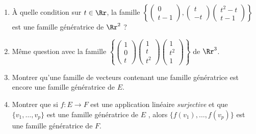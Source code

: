 \documentclass[class=report,crop=false]{standalone}
\begin{document}

\begin{miniexercices}
\sauteligne
\begin{enumerate}
  \item \`A quelle condition sur $t\in\Rr$, la famille
$\left\{
  \left(\begin{smallmatrix} 0 \\ t-1 \end{smallmatrix}\right),
  \left(\begin{smallmatrix} t \\ -t \end{smallmatrix}\right)
  \left(\begin{smallmatrix} t^2-t \\ t-1 \end{smallmatrix}\right)
  \right\}$
  est une famille génératrice de $\Rr^2$ ?

  \item   Même question avec la famille
  $\left\{
  \left(\begin{smallmatrix} 1 \\ 0 \\ t \end{smallmatrix}\right)
  \left(\begin{smallmatrix} 1 \\ t \\ t^2 \end{smallmatrix}\right)
  \left(\begin{smallmatrix} 1 \\ t^2 \\ 1 \end{smallmatrix}\right)
  \right\}$ de $\Rr^3$.

  \item Montrer qu'une famille de vecteurs contenant une famille
  génératrice est encore une famille génératrice de $E$.

  \item Montrer que si $f : E \to F$ est une application linéaire \emph{surjective}
  et que $\{ v_1, \ldots, v_p \}$  est une famille génératrice de $E$ ,
  alors $\big\{ f(v_1), \ldots, f(v_p) \big\}$ est une famille génératrice de $F$.
\end{enumerate}
\end{miniexercices}
\end{document}
